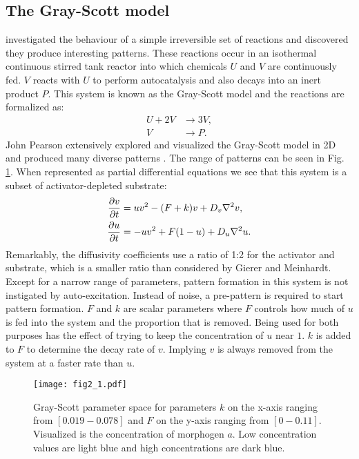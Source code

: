 \subsection{The Gray-Scott model}
\citet{gray1984} investigated the behaviour of a simple irreversible set of reactions and discovered they produce interesting patterns. These reactions occur in an isothermal continuous stirred tank reactor into which chemicals $U$ and $V$ are continuously fed. $V$ reacts with $U$ to perform autocatalysis and also decays into an inert product $P$. This system is known as the Gray-Scott model and the reactions are formalized as:
	\begin{equation}
	\begin{aligned}
	U + 2V &\to 3V, \\
	V &\to P.
	\end{aligned}
	\end{equation}
John Pearson extensively explored and visualized the Gray-Scott model in 2D and produced many diverse patterns \citep{pearson1993}. The range of patterns can be seen in Fig. \ref{fig:grayscottParameterMap}. When represented as partial differential equations we see that this system is a subset of activator-depleted substrate:
	\begin{equation}
	\begin{aligned} \label{eq:grayscottRD}
	\frac{\partial v}{\partial t} &= uv^2 - (F+k)v + D_v \nabla^2 v,\\
	\frac{\partial u}{\partial t} &= -uv^2 + F(1-u) + D_u \nabla^2 u.
	\end{aligned}
	\end{equation}
Remarkably, the diffusivity coefficients use a ratio of 1:2 for the activator and substrate, which is a smaller ratio than considered by Gierer and Meinhardt. Except for a narrow range of parameters, pattern formation in this system is not instigated by auto-excitation. Instead of noise, a pre-pattern is required to start pattern formation. $F$ and $k$ are scalar parameters where $F$ controls how much of $u$ is fed into the system and the proportion that is removed. Being used for both purposes has the effect of trying to keep the concentration of $u$ near $1$. $k$ is added to $F$ to determine the decay rate of $v$. Implying $v$ is always removed from the system at a faster rate than $u$.

\begin{figure}[H]
	\centering
	\texttt{[image: fig2\_1.pdf]}
	\caption{Gray-Scott parameter space for parameters $k$ on the x-axis ranging from $[0.019 - 0.078]$ and $F$ on the y-axis ranging from $[0 - 0.11]$. Visualized is the concentration of morphogen $a$. Low concentration values are light blue and high concentrations are dark blue.}
	\label{fig:grayscottParameterMap}
\end{figure}

